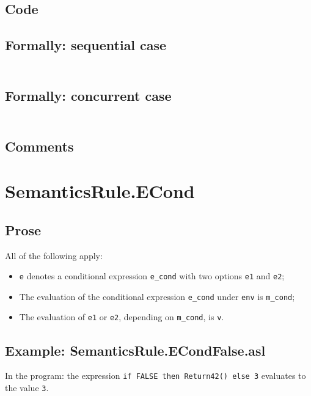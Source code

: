 \documentclass{book}
\begin{document}
  \subsection{Code}

  \subsection{Formally: sequential case}
  \begin{align}
  \end{align} 

  \subsection{Formally: concurrent case}
  \begin{align}
  \end{align} 

  \subsection{Comments}

\section{SemanticsRule.ECond \label{sec:SemanticsRule.ECond}}

  \subsection{Prose}
  All of the following apply:
  \begin{itemize}
  \item \texttt{e} denotes a conditional expression \texttt{e\_cond} with two options \texttt{e1} and \texttt{e2};
  \item The evaluation of the conditional expression \texttt{e\_cond} under \texttt{env} is \texttt{m\_cond};
  \item The evaluation of \texttt{e1} or \texttt{e2}, depending on \texttt{m\_cond}, is \texttt{v}.
  \end{itemize}

  \subsection{Example: SemanticsRule.ECondFalse.asl}
    In the program:
    the expression \texttt{if FALSE then Return42() else 3} evaluates to the value \texttt{3}.
\end{document}

